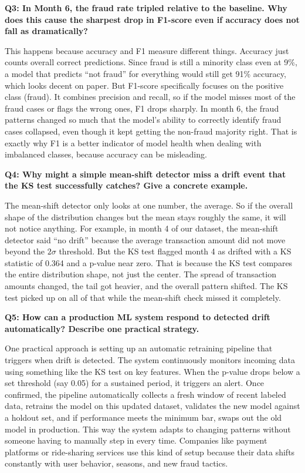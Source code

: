 \documentclass[12pt,a4paper]{article}
\begin{document}
\vspace{12pt}

\textbf{Q3: In Month 6, the fraud rate tripled relative to the baseline. Why does this cause the sharpest drop in F1-score even if accuracy does not fall as dramatically?}

This happens because accuracy and F1 measure different things. Accuracy just counts overall correct predictions. Since fraud is still a minority class even at 9\%, a model that predicts ``not fraud'' for everything would still get 91\% accuracy, which looks decent on paper. But F1-score specifically focuses on the positive class (fraud). It combines precision and recall, so if the model misses most of the fraud cases or flags the wrong ones, F1 drops sharply. In month 6, the fraud patterns changed so much that the model's ability to correctly identify fraud cases collapsed, even though it kept getting the non-fraud majority right. That is exactly why F1 is a better indicator of model health when dealing with imbalanced classes, because accuracy can be misleading.

\vspace{12pt}

\textbf{Q4: Why might a simple mean-shift detector miss a drift event that the KS test successfully catches? Give a concrete example.}

The mean-shift detector only looks at one number, the average. So if the overall shape of the distribution changes but the mean stays roughly the same, it will not notice anything. For example, in month 4 of our dataset, the mean-shift detector said ``no drift'' because the average transaction amount did not move beyond the $2\sigma$ threshold. But the KS test flagged month 4 as drifted with a KS statistic of 0.364 and a p-value near zero. That is because the KS test compares the entire distribution shape, not just the center. The spread of transaction amounts changed, the tail got heavier, and the overall pattern shifted. The KS test picked up on all of that while the mean-shift check missed it completely.

\vspace{12pt}

\textbf{Q5: How can a production ML system respond to detected drift automatically? Describe one practical strategy.}

One practical approach is setting up an automatic retraining pipeline that triggers when drift is detected. The system continuously monitors incoming data using something like the KS test on key features. When the p-value drops below a set threshold (say 0.05) for a sustained period, it triggers an alert. Once confirmed, the pipeline automatically collects a fresh window of recent labeled data, retrains the model on this updated dataset, validates the new model against a holdout set, and if performance meets the minimum bar, swaps out the old model in production. This way the system adapts to changing patterns without someone having to manually step in every time. Companies like payment platforms or ride-sharing services use this kind of setup because their data shifts constantly with user behavior, seasons, and new fraud tactics.
\end{document}
